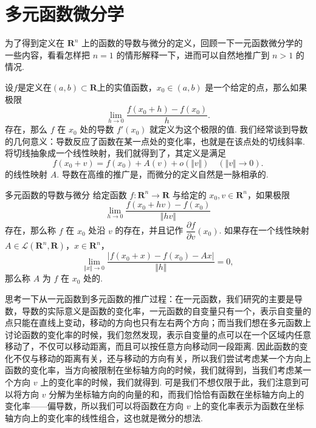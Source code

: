 
\section{多元函数微分学}

为了得到定义在 $\mathbf{R}^n$ 上的函数的导数与微分的定义，回顾一下一元函数微分学的一些内容，看看怎样把 $n=1$ 的情形解释一下，进而可以自然地推广到 $n>1$ 的情况.

设$f$是定义在$(a,b)\subset \mathbf{R}$上的实值函数，$x_0\in (a,b)$ 是一个给定的点，那么如果极限 \[\lim_{h\to 0}\frac{f(x_0 + h)-f(x_0)}{h}.\]
存在，那么 $f$ 在 $x_0$ 处的导数 $f'(x_0)$ 就定义为这个极限的值. 我们经常谈到导数的几何意义：导数反应了函数在某一点处的变化率，也就是在该点处的切线斜率. 将切线抽象成一个线性映射，我们就得到了，其定义是满足 \[f(x_0 + v) = f(x_0) + A(v) + o(\Vert v\Vert) \quad (\Vert v\Vert\to 0).\]
的线性映射 $A$. 导数在高维的推广是，而微分的定义自然是一脉相承的.

\begin{definition}{多元函数的导数与微分}{}
    给定函数 $f\colon \mathbf{R}^n\to\mathbf{R}$ 与给定的 $x_0, v\in\mathbf{R}^n$，如果极限 \[\lim_{h\to 0}\frac{f(x_0 + hv) - f(x_0)}{\Vert hv\Vert}\] 存在，那么称 $f$ 在 $x_0$ 处沿 $v$ 的存在，并且记作 $\dfrac{\partial f}{\partial v}(x_0)$. 如果存在一个线性映射 $A\in \mathcal{L}(\mathbf{R}^n, \mathbf{R})$，$x\in \mathbf{R}^n$，
    \[\lim\limits_{\Vert x \Vert \to0}\frac{\vert f(x_0 + x) - f(x_0) - Ax \vert}{\Vert h \Vert} = 0,\]
    那么称 $A$ 为 $f$ 在 $x_0$ 处的.
\end{definition}

思考一下从一元函数到多元函数的推广过程：在一元函数，我们研究的主要是导数，导数的实际意义是函数的变化率，一元函数的自变量只有一个，表示自变量的点只能在直线上变动，移动的方向也只有左右两个方向；而当我们想在多元函数上讨论函数的变化率的时候，我们忽然发现，表示自变量的点可以在一个区域内任意移动了，不仅可以移动距离，而且可以按任意方向移动同一段距离. 因此函数的变化不仅与移动的距离有关，还与移动的方向有关，所以我们尝试考虑某一个方向上函数的变化率，当方向被限制在坐标轴方向的时候，我们就得到，当我们考虑某一个方向 $v$ 上的变化率的时候，我们就得到. 可是我们不想仅限于此，我们注意到可以将方向 $v$ 分解为坐标轴方向的向量的和，而我们恰恰有函数在坐标轴方向上的变化率——偏导数，所以我们可以将函数在方向 $v$ 上的变化率表示为函数在坐标轴方向上的变化率的线性组合，这也就是微分的想法.

